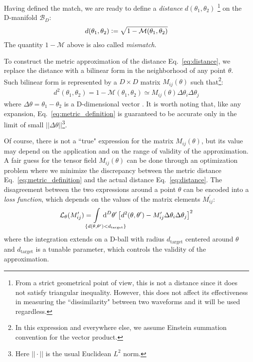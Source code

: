 \documentclass[twocolumn,showpacs,preprintnumbers,nofootinbib,prd,
superscriptaddress,10pt]{revtex4-2}
\newcommand{\dvol}[2]{\ensuremath{\operatorname{d}^{#2}\!{#1}}}
\begin{document}
Having defined the match, we are ready to define a {\it distance} $d(\theta_1,\theta_2)$ \footnote{
From a strict geometrical point of view, this is not a distance since it does not satisfy triangular inequality. However, this does not affect its effectiveness in measuring the ``dissimilarity" between two waveforms and it will be used regardless.}
on the D-manifold $\mathcal{B}_D$:
\begin{align}\label{eq:distance}
	d(\theta_1,\theta_2) \vcentcolon= \sqrt{1 - \mathcal{M}(\theta_1,\theta_2)}
\end{align}
The quantity $1-\mathcal{M}$ above is also called {\it mismatch}.

To construct the metric approximation of the distance Eq.~\eqref{eq:distance}, we replace the distance with a bilinear form in the neighborhood of any point $\theta$. Such bilinear form is represented by a $D\times D$ matrix $M_{ij}(\theta)$ such that\footnote{
In this expression and everywhere else, we assume Einstein summation convention for the vector product.}:
\begin{align}\label{eq:metric_definition}
	d^2(\theta_1,\theta_2) = 1 - \mathcal{M}(\theta_1,\theta_2) \simeq M_{ij}(\theta) \Delta\theta_i \Delta\theta_j
\end{align}
where $\Delta\theta = \theta_1-\theta_2$ is a D-dimensional vector \cite{owen_metric}.
It is worth noting that, like any expansion, Eq.~\eqref{eq:metric_definition} is guaranteed to be accurate only in the limit of small $||\Delta\theta||$\footnote{Here $||\cdot||$ is the usual Euclidean $L^2$ norm.}.

Of course, there is not a ``true" expression for the matrix $M_{ij}(\theta)$, but its value may depend on the application and on the range of validity of the approximation.
A fair guess for the tensor field $M_{ij}(\theta)$ can be done through an optimization problem where we minimize the discrepancy between the metric distance Eq.~\eqref{eq:metric_definition} and the actual distance Eq.~\eqref{eq:distance}.
The disagreement between the two expressions around a point $\theta$ can be encoded into a {\it loss function}, which depends on the values of the matrix elements $M^\prime_{ij}$:
\begin{equation} \label{eq:loss_function}
	\mathcal{L}_\theta(M^\prime_{ij}) = \hspace{-4em} \int\limits_{\hspace{3em}\{d(\theta,\theta^\prime) < d_\mathrm{target}\}} \hspace{-3.8em}
		\dvol{\theta^\prime}{D}  \left[ d^2(\theta,\theta^\prime) - M^\prime_{ij} \Delta\theta_i \Delta\theta_j \right]^2
\end{equation}
where the integration extends on a D-ball with radius $d_\mathrm{target}$ centered around $\theta$ and $d_\mathrm{target}$ is a tunable parameter, which controls the validity of the approximation.
\end{document}
